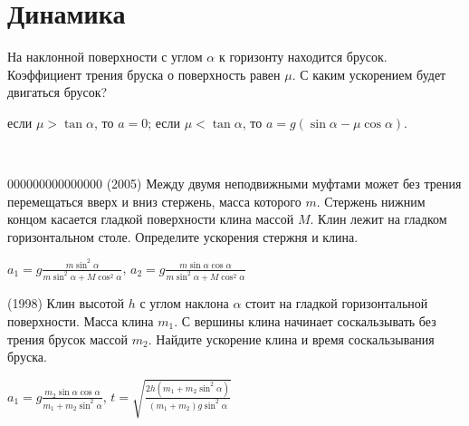 \section{Динамика}
 
\begin{ex}
На наклонной поверхности с углом $\alpha$ к горизонту находится брусок. 
Коэффициент трения бруска о поверхность равен $\mu$. С каким ускорением будет двигаться брусок?
\begin{ans}
если $\mu > \tan \alpha$, то $a = 0$; если $\mu < \tan \alpha$, то $a = g(\sin \alpha - \mu \cos \alpha)$.
\end{ans}
\end{ex}

\begin{ex}
\hspace{0pt} \\
\begin{minipage}{.65\textwidth}
	000000000000000
(2005) Между двумя неподвижными муфтами может без трения перемещаться вверх и вниз стержень, масса которого $m$. Стержень нижним концом касается гладкой поверхности клина массой $M$. Клин лежит на гладком горизонтальном столе. Определите ускорения стержня и клина.
\end{minipage}
\begin{minipage}{.35\textwidth}
\centering

\end{minipage}
\begin{ans}
$a_1 = g \frac{m \sin^2 \alpha}{m \sin^2 \alpha + M \cos^2 \alpha}$, $a_2 = g\frac{m \sin \alpha \cos \alpha}{m \sin^2 \alpha + M \cos^2 \alpha}$
\end{ans}
\end{ex}

\begin{ex}
(1998) Клин высотой $h$ с углом наклона $\alpha$ стоит на гладкой горизонтальной поверхности. Масса клина $m_1$. С вершины клина начинает соскальзывать без трения брусок массой $m_2$. Найдите ускорение клина и время соскальзывания бруска.
\begin{ans}
$a_1 = g \frac{m_2 \sin \alpha \cos \alpha}{m_1 + m_2 \sin^2 \alpha}$, $t=\sqrt{\frac{2h(m_1+m_2\sin^2\alpha)}{(m_1+m_2)g \sin^2 \alpha}}$
\end{ans}
\end{ex}

